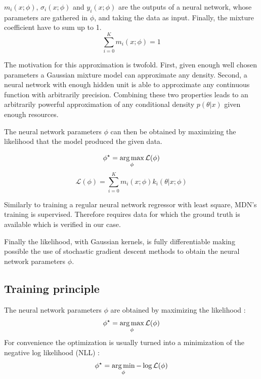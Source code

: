 $m_i(x ; \phi)$, $\sigma_i(x ; \phi)$ and $y_i(x ; \phi)$ are the outputs of a neural network, whose parameters are gathered in $\phi$, and taking the data as input.
Finally, the mixture coefficient have to sum up to 1.
\begin{equation}
    \sum_{i=0}^K m_i(x ; \phi) =  1
\end{equation}

The motivation for this approximation is twofold.
First, given enough well chosen parameters a Gaussian mixture model can approximate any density.
Second, a neural network with enough hidden unit is able to approximate any continuous function with arbitrarily precision.
Combining these two properties leads to an arbitrarily powerful approximation of any conditional density $p(\theta|x)$ given enough resources.

The neural network parameters $\phi$ can then be obtained by maximizing the likelihood that the model produced the given data.

\begin{equation}
    \phi^\star = \operatorname*{arg\,max}_\phi \mathcal L (\phi)
\end{equation}
\begin{equation}
    \mathcal L (\phi) = \sum_{i=0}^K m_i(x ; \phi) k_i(\theta | x ; \phi)
\end{equation}

Similarly to training a regular neural network regressor with least square, MDN's training is supervised.
Therefore requires data for which the ground truth is available which is verified in our case.

Finally the likelihood, with Gaussian kernels, is fully differentiable making possible the use of stochastic gradient descent methods to obtain the neural network parameters $\phi$.







\subsection{Training principle} %
\label{sub:training_principle}


The neural network parameters $\phi$ are obtained by maximizing the likelihood :
\begin{equation}
    \phi^\star = \operatorname*{arg\,max}_\phi \mathcal L (\phi)
\end{equation}
For convenience the optimization is usually turned into a minimization of the negative log likelihood (NLL) :
\begin{equation}
    \phi^\star = \operatorname*{arg\,min}_\phi - \log \mathcal L (\phi)
\end{equation}

